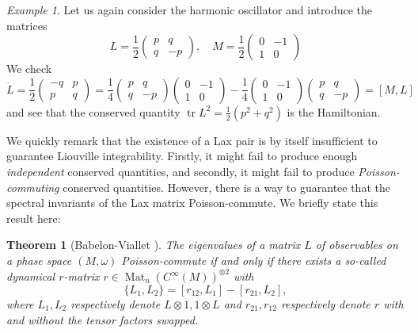 \documentclass[11pt]{report}
\newtheorem{theorem}{Theorem}[section]
\theoremstyle{definition}
\theoremstyle{remark}
\theoremstyle{remark}
\newtheorem*{example}{Example}
\begin{document}
\begin{example}
Let us again consider the harmonic oscillator and introduce the matrices
\begin{equation*}
L = \frac{1}{2}
\begin{pmatrix}
p & q \\ q & -p
\end{pmatrix},
\quad
M = \frac{1}{2}
\begin{pmatrix}
0 & -1 \\
1 & 0
\end{pmatrix}
\end{equation*}
We check
\begin{equation*}
\dot L = \frac{1}{2}
\begin{pmatrix}
-q & p \\ p & q
\end{pmatrix}
=
\frac{1}{4}
\begin{pmatrix}
p & q \\ q & -p
\end{pmatrix}
\begin{pmatrix}
0 & -1 \\
1 & 0
\end{pmatrix}
-
\frac{1}{4}
\begin{pmatrix}
0 & -1 \\
1 & 0
\end{pmatrix}
\begin{pmatrix}
p & q \\ q & -p
\end{pmatrix}
= [M,L]
\end{equation*}
and see that the conserved quantity $\operatorname{tr} L^2 = \frac{1}{2}(p^2+q^2)$ is the Hamiltonian.
\end{example}

We quickly remark that the existence of a Lax pair is by itself insufficient to guarantee Liouville integrability. Firstly, it might fail to produce enough \emph{independent} conserved quantities, and secondly, it might fail to produce \emph{Poisson-commuting} conserved quantities. However, there is a way to guarantee that the spectral invariants of the Lax matrix Poisson-commute. We briefly state this result here:

\begin{theorem}[Babelon-Viallet \cite{book:arutyunov:elements}]
The eigenvalues of a matrix $L$ of observables on a phase space $(M,\omega)$ Poisson-commute if and only if there exists a so-called \emph{dynamical $r$-matrix} $r \in \operatorname{Mat}_n(C^\infty(M))^{\otimes 2}$ with
\begin{equation*}
\{ L_1, L_2 \} = [r_{12},L_1] - [r_{21},L_2],
\end{equation*}
where $L_1,L_2$ respectively denote $L \otimes 1, 1 \otimes L$ and $r_{21},r_{12}$ respectively denote $r$ with and without the tensor factors swapped.
\end{theorem}
\end{document}
